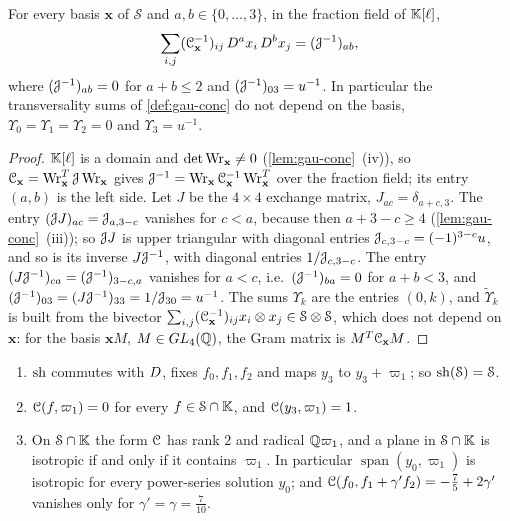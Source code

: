 
\begin{lem}[Transversality]
\label{lem:gau-transv}
For every basis $\mathbf x$ of $\mathcal S$ and $a,b\in\{0,\dots,3\}$, in the fraction field of $\mathbb{K}[\ell]$,
\[
\sum_{i,j}(\mathcal{C}_{\mathbf x}^{-1})_{ij}\,D^ax_i\,D^bx_j=(\mathcal{J}^{-1})_{ab},
\]
where $(\mathcal{J}^{-1})_{ab}=0$ for $a+b\leq2$ and $(\mathcal{J}^{-1})_{03}=u^{-1}$. In particular the transversality sums of \cref{def:gau-conc} do not depend on the basis, $\Upsilon_0=\Upsilon_1=\Upsilon_2=0$ and $\Upsilon_3=u^{-1}$.
\end{lem}

\begin{proof}
$\mathbb{K}[\ell]$ is a domain and $\det\operatorname{Wr}_{\mathbf x}\neq0$ (\cref{lem:gau-conc}~(iv)), so $\mathcal{C}_{\mathbf x}=\operatorname{Wr}_{\mathbf x}^T\mathcal{J}\operatorname{Wr}_{\mathbf x}$ gives $\mathcal{J}^{-1}=\operatorname{Wr}_{\mathbf x}\mathcal{C}_{\mathbf x}^{-1}\operatorname{Wr}_{\mathbf x}^T$ over the fraction field; its entry $(a,b)$ is the left side. Let $J$ be the $4\times4$ exchange matrix, $J_{ac}=\delta_{a+c,3}$. The entry $(\mathcal{J} J)_{ac}=\mathcal{J}_{a,3-c}$ vanishes for $c<a$, because then $a+3-c\geq4$ (\cref{lem:gau-conc}~(iii)); so $\mathcal{J} J$ is upper triangular with diagonal entries $\mathcal{J}_{c,3-c}=(-1)^{3-c}u$, and so is its inverse $J\mathcal{J}^{-1}$, with diagonal entries $1/\mathcal{J}_{c,3-c}$. The entry $(J\mathcal{J}^{-1})_{ca}=(\mathcal{J}^{-1})_{3-c,a}$ vanishes for $a<c$, i.e.\ $(\mathcal{J}^{-1})_{ba}=0$ for $a+b<3$, and $(\mathcal{J}^{-1})_{03}=(J\mathcal{J}^{-1})_{33}=1/\mathcal{J}_{30}=u^{-1}$. The sums $\Upsilon_k$ are the entries $(0,k)$, and $\widetilde\Upsilon_k$ is built from the bivector $\sum_{i,j}(\mathcal{C}_{\mathbf x}^{-1})_{ij}x_i\otimes x_j\in\mathcal S\otimes\mathcal S$, which does not depend on $\mathbf x$: for the basis $\mathbf xM$, $M\in GL_4(\mathbb{Q})$, the Gram matrix is $M^T\mathcal{C}_{\mathbf x}M$.
\end{proof}

\begin{lem}
\label{lem:gau-iso}
\begin{enumerate}
\item $\mathrm{sh}$ commutes with $D$, fixes $f_0,f_1,f_2$ and maps $y_3$ to $y_3+\varpi_1$; so $\mathrm{sh}(\mathcal S)=\mathcal S$.
\item $\mathcal{C}(f,\varpi_1)=0$ for every $f\in\mathcal S\cap\mathbb{K}$, and $\mathcal{C}(y_3,\varpi_1)=1$.
\item On $\mathcal S\cap\mathbb{K}$ the form $\mathcal{C}$ has rank $2$ and radical $\mathbb{Q}\varpi_1$, and a plane in $\mathcal S\cap\mathbb{K}$ is isotropic if and only if it contains $\varpi_1$. In particular $\operatorname{span}(y_0,\varpi_1)$ is isotropic for every power-series solution $y_0$; and $\mathcal{C}(f_0,f_1+\gamma'f_2)=-\frac75+2\gamma'$ vanishes only for $\gamma'=\gamma=\frac7{10}$.
\end{enumerate}
\end{lem}

